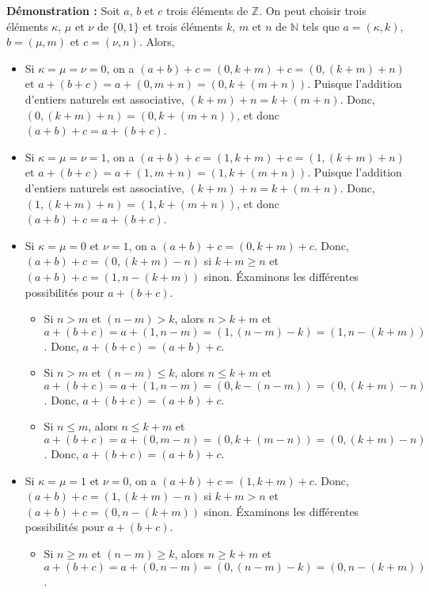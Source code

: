 \noindent\textbf{Démonstration :} 
    Soit $a$, $b$ et $c$ trois éléments de $\mathbb{Z}$. 
    On peut choisir trois éléments $\kappa$, $\mu$ et $\nu$ de $\lbrace 0, 1 \rbrace$ et trois éléments $k$, $m$ et $n$ de $\mathbb{N}$ tels que $a = (\kappa, k)$, $b = (\mu, m)$ et $c = (\nu, n)$. 
    Alors, 
    \begin{itemize}[nosep]
        \item Si $\kappa = \mu = \nu = 0$, on a $(a+b)+c = (0,k+m)+c = (0,(k+m)+n)$ et $a+(b+c) = a+(0,m+n) = (0,k+(m+n))$. 
            Puisque l'addition d'entiers naturels est associative, $(k+m)+n = k+(m+n)$. 
            Donc, $(0,(k+m)+n) = (0,k+(m+n))$, et donc $(a+b)+c = a+(b+c)$.
        \item Si $\kappa = \mu = \nu = 1$, on a $(a+b)+c = (1,k+m)+c = (1,(k+m)+n)$ et $a+(b+c) = a+(1,m+n) = (1,k+(m+n))$. 
            Puisque l'addition d'entiers naturels est associative, $(k+m)+n = k+(m+n)$. 
            Donc, $(1,(k+m)+n) = (1,k+(m+n))$, et donc $(a+b)+c = a+(b+c)$.
        \item Si $\kappa = \mu = 0$ et $\nu = 1$, on a $(a+b)+c = (0,k+m)+c$.
            Donc, $(a+b)+c = (0,(k+m)-n)$ si $k+m \geq n$ et $(a+b)+c = (1,n-(k+m))$ sinon. 
            Éxaminons les différentes possibilités pour $a+(b+c)$. 
            \begin{itemize}[nosep]
                \item Si $n > m$ et $(n-m) > k$, alors $n > k+m$ et $a + (b+c) = a + (1,n-m) = (1, (n-m)-k) = (1, n-(k+m))$.
                    Donc, $a+(b+c) = (a+b)+c$.
                \item Si $n > m$ et $(n-m) \leq k$, alors $n \leq k+m$ et $a + (b+c) = a + (1,n-m) = (0, k-(n-m)) = (0, (k+m)-n)$.
                    Donc, $a+(b+c) = (a+b)+c$.
                \item Si $n \leq m$, alors $n \leq k+m$ et $a+(b+c) = a + (0, m-n) = (0, k+(m-n)) = (0, (k+m)-n)$.
                    Donc, $a+(b+c) = (a+b)+c$.
            \end{itemize}
        \item Si $\kappa = \mu = 1$ et $\nu = 0$, on a $(a+b)+c = (1,k+m)+c$.
            Donc, $(a+b)+c = (1,(k+m)-n)$ si $k+m > n$ et $(a+b)+c = (0,n-(k+m))$ sinon. 
            Éxaminons les différentes possibilités pour $a+(b+c)$. 
            \begin{itemize}[nosep]
                \item Si $n \geq m$ et $(n-m) \geq k$, alors $n \geq k+m$ et $a + (b+c) = a + (0,n-m) = (0, (n-m)-k) = (0, n-(k+m))$.

\end{itemize}
\end{itemize}
